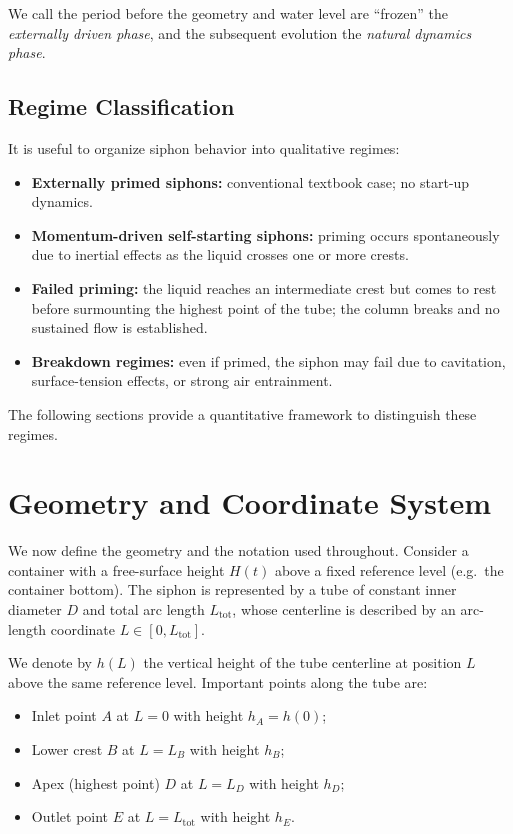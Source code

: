 \documentclass[11pt]{article}
\begin{document}
We call the period before the geometry and water level are ``frozen'' the \emph{externally driven phase}, and the subsequent evolution the \emph{natural dynamics phase}.

\subsection{Regime Classification}

It is useful to organize siphon behavior into qualitative regimes:
\begin{itemize}
  \item \textbf{Externally primed siphons:} conventional textbook case; no start-up dynamics.
  \item \textbf{Momentum-driven self-starting siphons:} priming occurs spontaneously due to inertial effects as the liquid crosses one or more crests.
  \item \textbf{Failed priming:} the liquid reaches an intermediate crest but comes to rest before surmounting the highest point of the tube; the column breaks and no sustained flow is established.
  \item \textbf{Breakdown regimes:} even if primed, the siphon may fail due to cavitation, surface-tension effects, or strong air entrainment.
\end{itemize}
The following sections provide a quantitative framework to distinguish these regimes.

\section{Geometry and Coordinate System}
\label{sec:geometry}

We now define the geometry and the notation used throughout.
Consider a container with a free-surface height $H(t)$ above a fixed reference level (e.g.\ the container bottom).
The siphon is represented by a tube of constant inner diameter $D$ and total arc length $L_{\text{tot}}$, whose centerline is described by an arc-length coordinate $L \in [0,L_{\text{tot}}]$.

We denote by $h(L)$ the vertical height of the tube centerline at position $L$ above the same reference level.
Important points along the tube are:
\begin{itemize}
  \item Inlet point $A$ at $L = 0$ with height $h_A = h(0)$;
  \item Lower crest $B$ at $L = L_B$ with height $h_B$;
  \item Apex (highest point) $D$ at $L = L_D$ with height $h_D$;
  \item Outlet point $E$ at $L = L_{\text{tot}}$ with height $h_E$.
\end{itemize}
\end{document}
